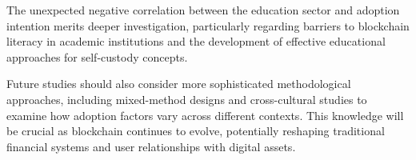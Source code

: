 \documentclass[twocolumn]{article}
\begin{document}
The unexpected negative correlation between the education sector and adoption intention merits deeper investigation, particularly regarding barriers to blockchain literacy in academic institutions and the development of effective educational approaches for self-custody concepts.

Future studies should also consider more sophisticated methodological approaches, including mixed-method designs and cross-cultural studies to examine how adoption factors vary across different contexts. This knowledge will be crucial as blockchain continues to evolve, potentially reshaping traditional financial systems and user relationships with digital assets.




\onecolumn
\clearpage
{}
\printbibliography[title={References}]
\end{document}
